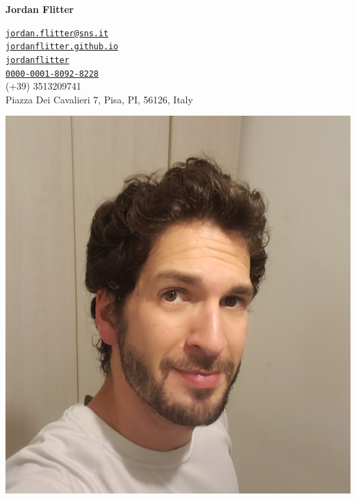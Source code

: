 \documentclass[letterpaper,12pt]{article}
\def\name{Jordan Flitter}
\begin{document}
\begin{minipage}{0.6\textwidth}
{\huge \bf\name}
\vspace{5mm}

{\Large \faEnvelope[regular]} \quad \href{mailto:jordan.flitter@sns.it}{\tt jordan.flitter@sns.it}
\\
{\Large \faGlobe} \quad \href{https://jordanflitter.github.io/}{\tt jordanflitter.github.io}
\\
{\Large \faGithubSquare} \quad \href{https://github.com/jordanflitter}{\tt jordanflitter}
\\
{\Large \faOrcid} \quad \href{https://orcid.org/0000-0001-8092-8228}{\tt 0000-0001-8092-8228}
\\
{\Large \faPhone*} \quad (+39) 3513209741
\\
{\Large \faMapMarker*} \quad Piazza Dei Cavalieri 7, Pisa, PI, 56126, Italy
\end{minipage}
\hfill
\begin{minipage}{0.3\textwidth}
\includegraphics[width=\linewidth]{avatar.jpg}
\end{minipage}

\vspace{5mm}
\end{document}
